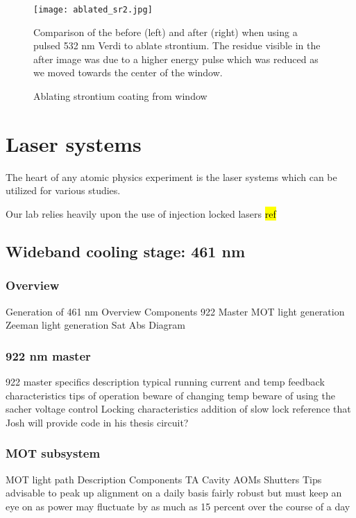 	\begin{figure}
		\centerline{
		\texttt{[image: ablated\_sr2.jpg]}}
		\caption{Ablating strontium coating from window}{Comparison of the before (left) and after (right) when using a pulsed 532 nm Verdi to ablate strontium. The residue visible in the after image was due to a higher energy pulse which was reduced as we moved towards the center of the window.}
		\label{fig:ablating_strontium}
	\end{figure} 



\section{Laser systems}
\label{sec:laser_systems}

The heart of any atomic physics experiment is the laser systems which can be utilized for various studies. 

Our lab relies heavily upon the use of injection locked lasers \hl{ref}

\subsection{Wideband cooling stage: 461 nm}
\label{ssec:461sys}

\subsubsection{Overview}

Generation of 461 nm
	Overview
	Components
		922 Master
		MOT light generation
		Zeeman light generation
		Sat Abs
	Diagram

\subsubsection{922 nm master}

922 master specifics
	description
	typical running current and temp
	feedback characteristics
	tips of operation
		beware of changing temp
		beware of using the sacher voltage control
	Locking characteristics
		addition of slow lock
			reference that Josh will provide code in his thesis
		circuit?

\subsubsection{MOT subsystem}

MOT light path
	Description
	Components
		TA
		Cavity
		AOMs
		Shutters
	Tips
		advisable to peak up alignment on a daily basis 		
		fairly robust but must keep an eye on as power may fluctuate by as much as 15 percent over the course of a day
	
